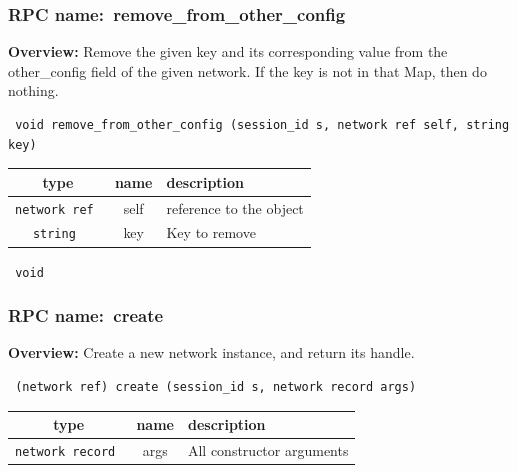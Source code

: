 \vspace{0.3cm}
\vspace{0.3cm}
\vspace{0.3cm}
\subsubsection{RPC name:~remove\_from\_other\_config}

{\bf Overview:} 
Remove the given key and its corresponding value from the other\_config
field of the given network.  If the key is not in that Map, then do
nothing.

\begin{verbatim} void remove_from_other_config (session_id s, network ref self, string key)\end{verbatim}



 
\vspace{0.3cm}
\begin{tabular}{|c|c|p{7cm}|}
 \hline
{\bf type} & {\bf name} & {\bf description} \\ \hline
{\tt network ref } & self & reference to the object \\ \hline 

{\tt string } & key & Key to remove \\ \hline 

\end{tabular}

\vspace{0.3cm}

{\tt 
void
}



\vspace{0.3cm}
\vspace{0.3cm}
\vspace{0.3cm}
\subsubsection{RPC name:~create}

{\bf Overview:} 
Create a new network instance, and return its handle.

\begin{verbatim} (network ref) create (session_id s, network record args)\end{verbatim}



 
\vspace{0.3cm}
\begin{tabular}{|c|c|p{7cm}|}
 \hline
{\bf type} & {\bf name} & {\bf description} \\ \hline
{\tt network record } & args & All constructor arguments \\ \hline 

\end{tabular}

